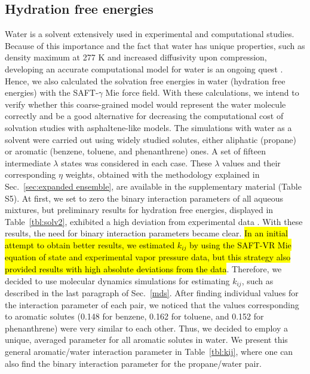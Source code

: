 \documentclass[final,12p,times,twocolumn]{elsarticle}
\begin{document}
	\subsection{Hydration free energies}
	
	Water is a solvent extensively used in experimental and computational studies. Because of this importance and the fact that water has unique properties, such as density maximum at 277 K and increased diffusivity upon compression, developing an accurate computational model for water is an ongoing quest \cite{hadley2012}. Hence, we also calculated the solvation free energies in water (hydration free energies) with the SAFT-$\gamma$ Mie force field. With these calculations, we intend to verify whether this coarse-grained model would represent the water molecule correctly and be a good alternative for decreasing the computational cost of solvation studies with asphaltene-like models. The simulations with water as a solvent were carried out using widely studied solutes, either aliphatic (propane) or aromatic (benzene, toluene, and phenanthrene) ones. A set of fifteen intermediate $\lambda$ states was considered in each case. These $\lambda$ values and their corresponding $\eta$ weights, obtained with the methodology explained in Sec.~\ref{sec:expanded ensemble}, are available in the supplementary material (Table S5). At first, we set to zero the binary interaction parameters of all aqueous mixtures, but preliminary results for hydration free energies, displayed in Table~\ref{tbl:solv2}, exhibited a high deviation from experimental data \cite{P29900000291, doi:10.1021/ct050097l}. With these results, the need for binary interaction parameters became clear. \hl{In an initial attempt to obtain better results, we estimated $k_{ij}$ by using the SAFT-VR Mie equation of state and experimental vapor pressure data, but this strategy also provided results with high absolute deviations from the data}.
	Therefore, we decided to use molecular dynamics simulations for estimating $k_{ij}$, such as described in the last paragraph of Sec.~\ref{mds}. After finding individual values for the interaction parameter of each pair, we noticed that the values corresponding to aromatic solutes (0.148 for benzene, 0.162 for toluene, and 0.152 for phenanthrene) were very similar to each other. Thus, we decided to employ a unique, averaged parameter for all aromatic solutes in water. We present this general aromatic/water interaction parameter in Table~\ref{tbl:kij}, where one can also find the binary interaction parameter for the propane/water pair.
\end{document}
